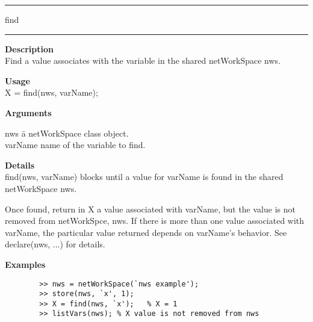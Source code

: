 \rule[0.06in]{6in}{0.01in}
\newline
find
\newline
\rule{6in}{0.01in}
\begin{list}{}{}
	\item {\bf Description}\\
	Find a value associates with the variable in the shared netWorkSpace nws.
	\item {\bf Usage}\\
	X = find(nws, varName);
	\item {\bf Arguments}
		\begin{tabbing}
		nws	\hspace{2.5cm} \= a netWorkSpace class object. \\
		varName \> name of the variable to find.
		\end{tabbing}
	\item {\bf Details}\\
	find(nws, varName) blocks until a value for varName is found in the shared netWorkSpace nws.
    
	Once found, return in X a value associated with varName, but the value is not removed from
	netWorkSpce, nws. If there is more than one value associated with varName, 
	the particular value returned depends on varName's behavior. See declare(nws, ...) for details.
	\item {\bf Examples}
		\begin{verbatim}
		>> nws = netWorkSpace(`nws example');
		>> store(nws, `x', 1);
		>> X = find(nws, `x');   % X = 1
		>> listVars(nws); % X value is not removed from nws
		\end{verbatim}
\end{list}


